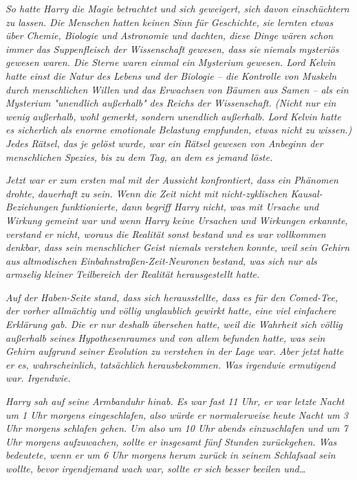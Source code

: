{\emph{So hatte Harry die Magie betrachtet und sich geweigert, sich davon einschüchtern zu lassen. Die Menschen hatten keinen Sinn für Geschichte, sie lernten etwas über Chemie, Biologie und Astronomie und dachten, diese Dinge wären schon immer das Suppenfleisch der Wissenschaft gewesen, dass sie} \emph{\emph{niemals}} \emph{mysteriös gewesen waren. Die Sterne waren einmal ein Mysterium gewesen. Lord Kelvin hatte einst die Natur des Lebens und der Biologie -- die Kontrolle von Muskeln durch menschlichen Willen und das Erwachsen von Bäumen aus Samen -- als ein Mysterium "unendlich außerhalb" des Reichs der Wissenschaft. (Nicht nur ein wenig außerhalb, wohl gemerkt, sondern} \emph{\emph{unendlich}} \emph{außerhalb. Lord Kelvin hatte es sicherlich als enorme emotionale Belastung empfunden,} \emph{\emph{etwas nicht zu wissen.}) Jedes Rätsel, das je gelöst wurde, war ein Rätsel gewesen von Anbeginn der menschlichen Spezies, bis zu dem Tag, an dem es jemand löste.}

\emph{Jetzt war er zum ersten mal mit der Aussicht konfrontiert, dass ein Phänomen drohte,} \emph{\emph{dauerhaft}} \emph{zu sein. Wenn die Zeit nicht mit nicht-zyklischen Kausal-Beziehungen funktionierte, dann begriff Harry nicht, was mit Ursache und Wirkung gemeint war und wenn Harry keine Ursachen und Wirkungen erkannte, verstand er nicht, woraus die Realität sonst bestand und es war vollkommen denkbar, dass sein menschlicher Geist niemals verstehen} \emph{\emph{konnte,}} \emph{weil sein Gehirn aus} \emph{\emph{altmodischen Einbahnstraßen-Zeit-Neuronen}} \emph{bestand, was sich nur als armselig kleiner Teilbereich der Realität herausgestellt hatte.}

\emph{Auf der Haben-Seite stand, dass sich herausstellte, dass es für den Comed-Tee, der vorher allmächtig und völlig unglaublich gewirkt hatte, eine viel einfachere Erklärung gab. Die er} \emph{\emph{nur deshalb}} \emph{übersehen hatte, weil die Wahrheit sich völlig außerhalb seines Hypothesenraumes und von allem befunden hatte, was sein Gehirn aufgrund seiner Evolution zu verstehen in der Lage war. Aber jetzt} \emph{\emph{hatte}} \emph{er es, wahrscheinlich, tatsächlich herausbekommen. Was irgendwie ermutigend war. Irgendwie.}

\emph{Harry sah auf seine Armbanduhr hinab. Es war fast 11 Uhr, er war letzte Nacht um 1 Uhr morgens eingeschlafen, also würde er normalerweise heute Nacht um 3 Uhr morgens schlafen gehen. Um also um 10 Uhr abends einzuschlafen und um 7 Uhr morgens aufzuwachen, sollte er insgesamt fünf Stunden zurückgehen. Was bedeutete, wenn er um 6 Uhr morgens herum zurück in seinem Schlafsaal sein wollte, bevor} \emph{irgendjemand wach war, sollte er sich besser beeilen und…}

}
